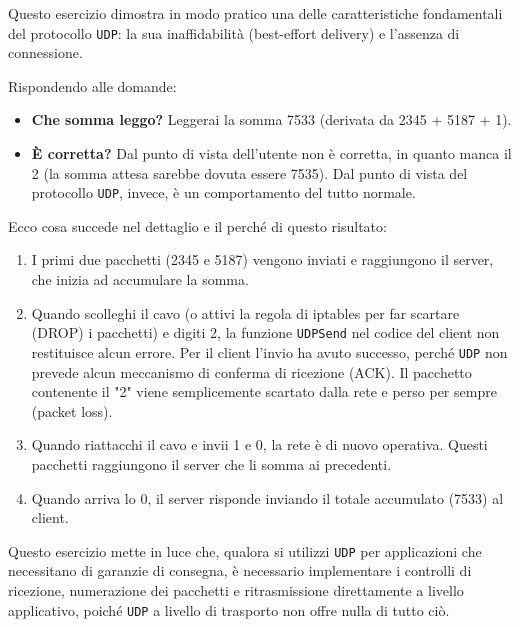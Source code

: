 \documentclass[11pt]{article}
\begin{document}
\begin{tcolorbox}[colback=green!5!white,colframe=green!75!black,title=\textbf{RISPOSTA}, breakable]
Questo esercizio dimostra in modo pratico una delle caratteristiche fondamentali del protocollo \texttt{UDP}: la sua inaffidabilità (best-effort delivery) e l'assenza di connessione.

Rispondendo alle domande:

\begin{itemize}
    \item \textbf{Che somma leggo?} Leggerai la somma 7533 (derivata da 2345 + 5187 + 1).
    \item \textbf{È corretta?} Dal punto di vista dell'utente non è corretta, in quanto manca il 2 (la somma attesa sarebbe dovuta essere 7535). Dal punto di vista del protocollo \texttt{UDP}, invece, è un comportamento del tutto normale.
\end{itemize}

Ecco cosa succede nel dettaglio e il perché di questo risultato:

\begin{enumerate}
    \item I primi due pacchetti (2345 e 5187) vengono inviati e raggiungono il server, che inizia ad accumulare la somma.
    \item Quando scolleghi il cavo (o attivi la regola di iptables per far scartare (DROP) i pacchetti) e digiti 2, la funzione \texttt{UDPSend} nel codice del client non restituisce alcun errore. Per il client l'invio ha avuto successo, perché \texttt{UDP} non prevede alcun meccanismo di conferma di ricezione (ACK). Il pacchetto contenente il "2" viene semplicemente scartato dalla rete e perso per sempre (packet loss).
    \item Quando riattacchi il cavo e invii 1 e 0, la rete è di nuovo operativa. Questi pacchetti raggiungono il server che li somma ai precedenti.
    \item Quando arriva lo 0, il server risponde inviando il totale accumulato (7533) al client.
\end{enumerate}

Questo esercizio mette in luce che, qualora si utilizzi \texttt{UDP} per applicazioni che necessitano di garanzie di consegna, è necessario implementare i controlli di ricezione, numerazione dei pacchetti e ritrasmissione direttamente a livello applicativo, poiché \texttt{UDP} a livello di trasporto non offre nulla di tutto ciò.
\end{tcolorbox}
\end{document}

